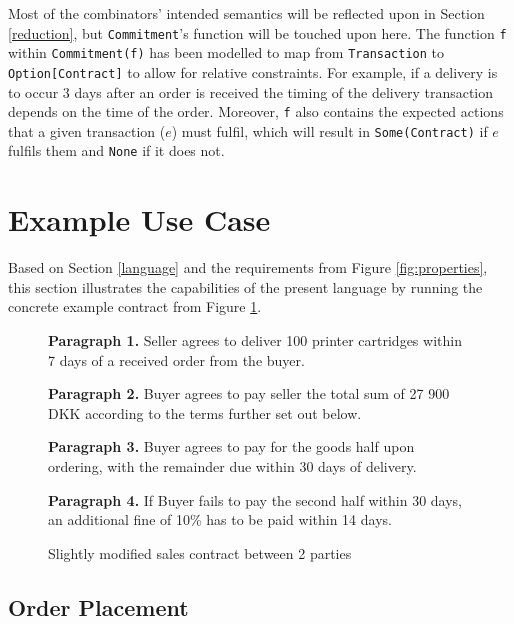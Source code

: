 \documentclass{ituthesis}
\begin{document}
Most of the combinators' intended semantics will be reflected upon in Section \ref{reduction}, but \texttt{Commitment}'s function will be touched upon here. The function \texttt{f} within \texttt{Commitment(f)} has been modelled to map from \texttt{Transaction} to \texttt{Option[Contract]} to allow for relative constraints. For example, if a delivery is to occur 3 days after an order is received the timing of the delivery transaction depends on the time of the order. Moreover, \texttt{f} also contains the expected actions that a given transaction ($e$) must fulfil, which will result in \texttt{Some(Contract)} if $e$ fulfils them and \texttt{None} if it does not.

\section{Example Use Case} \label{exampleUseCase}

Based on Section \ref{language} and the requirements from Figure \ref{fig:properties}, this section illustrates the capabilities of the present language by running the concrete example contract from Figure \ref{fig:contract}.

\begin{figure}[!h]
    \centering
    \begin{tcolorbox}
        \textbf{Paragraph 1.} Seller agrees to deliver 100 printer cartridges within 7 days of a received order from the buyer.\par
        \textbf{Paragraph 2.} Buyer agrees to pay seller the total sum of 27 900 DKK according to the terms further set out below.\par
        \textbf{Paragraph 3.} Buyer agrees to pay for the goods half upon ordering, with the remainder due within
        30 days of delivery.\par
        \textbf{Paragraph 4.} If Buyer fails to pay the second half within 30 days, an additional fine of 10\% has
        to be paid within 14 days.\par
    \end{tcolorbox}
    \caption{Slightly modified sales contract between 2 parties \cite{hvitved2011contract}}
    \label{fig:contract}
\end{figure}

\subsection{Order Placement}\label{firstCommitment}
\end{document}
